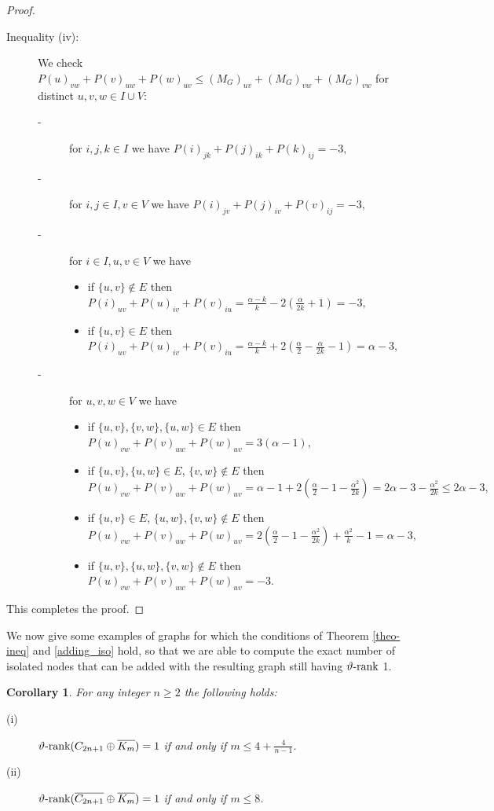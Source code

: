 \documentclass[11pt]{article}
\newtheorem{coro}[theorem]{Corollary}
\numberwithin{equation}{section}
\newcommand{\rrank}{\vartheta\text{\rm -rank}}
\begin{document}
\begin{proof}
\begin{description}
\item[Inequality (iv):] We check $P(u)_{vw}+P(v)_{uw}+P(w)_{uv}\le (M_G)_{uv}+(M_G)_{vw}+(M_G)_{vw}$ for distinct $u,v,w\in I\cup V$:
	\begin{description}
		\item[-] for  $i,j,k\in I$ we have   $P(i)_{jk}+P(j)_{ik}+P(k)_{ij}=-3,$
		 \item [-] for  $i,j\in I, v\in V$ we have $P(i)_{jv}+P(j)_{iv}+P(v)_{ij}=-3,$
		\item [-] for $i\in I, u,v\in V$ we have
			\begin{itemize}
        				\item if $\{u,v\}\notin E$ then   $P(i)_{uv}+P(u)_{iv}+P(v)_{iu}=\frac{\alpha-k}{k}-2(\frac{\alpha}{2k}+1)=-3,$
        				\item  if $\{u,v\}\in E$ then $P(i)_{uv}+P(u)_{iv}+P(v)_{iu}=\frac{\alpha-k}{k}+2(\frac{\alpha}{2}-\frac{\alpha}{2k}-1)=\alpha-3,$
			\end{itemize}
		\item[-] for $u,v,w\in V$ we have
			\begin{itemize}
        				\item if $\{u,v\},\{v,w\}, \{u,w\}\in E$ then  $P(u)_{vw}+P(v)_{uw}+P(w)_{uv}=3(\alpha-1),$
        				\item if $\{u,v\},\{u,w\}\in E$, $\{v,w\}\notin E$ then $P(u)_{vw}+P(v)_{uw}+P(w)_{uv}=\alpha-1+2(\frac{\alpha}{2}-1-\frac{\alpha^2}{2k})=2\alpha-3-\frac{\alpha^2}{2k}\leq 2\alpha-3,$
        				\item if $\{u,v\}\in E$, $\{u,w\},\{v,w\}\notin E$ then $P(u)_{vw}+P(v)_{uw}+P(w)_{uv}=2(\frac{\alpha}{2}-1-\frac{\alpha^2}{2k})+\frac{\alpha^2}{k}-1=\alpha-3,$
        				\item if $\{u,v\},\{u,w\}, \{v,w\} \notin E$ then $P(u)_{vw}+P(v)_{uw}+P(w)_{uv}=-3.$
    			\end{itemize}
	\end{description} 
\end{description}
This completes the proof.
\end{proof}

We now give  some examples of graphs for which the conditions of Theorem \ref{theo-ineq} and \ref{adding_iso} hold, so that we are able to compute the exact number of isolated nodes that can be added with  the resulting graph still having  $\rrank$ 1.


\begin{coro} \label{cor-cycle-isolated}
For any integer  $n\geq 2$ the following holds: 
\begin{description} 
	\item [(i)] $\rrank(C_{2n+1} \oplus \overline{K_m})=1$ if and only if $m\leq 4+\frac{4}{n-1}$. 
	\item [(ii)] $\rrank(\overline{C_{2n+1} }\oplus \overline{K_m})=1$ if and only if $m\leq 8$.
\end{description}
\end{coro}
\end{document}

